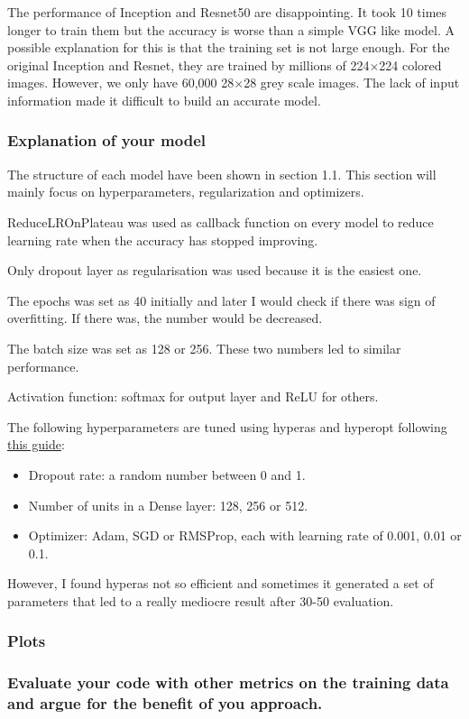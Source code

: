 \documentclass[12pt]{article}
\begin{document}
The performance of Inception and Resnet50 are disappointing. It took 10 times longer to train them but the accuracy is worse than a simple VGG like model. A possible explanation for this is that the training set is not large enough. For the original Inception and Resnet, they are trained by millions of 
224$\times$224 colored images. However, we only have 60,000 28$\times$28 grey scale images. The lack of input information made it difficult to build an accurate model.

\subsubsection{Explanation of your model}

The structure of each model have been shown in section 1.1. This section will mainly focus on hyperparameters, regularization and optimizers.

ReduceLROnPlateau was used as callback function on every model to reduce learning rate when the accuracy has stopped improving.

Only dropout layer as regularisation was used because it is the easiest one.

The epochs was set as 40 initially and later I would check if there was sign of overfitting. If there was, the number would be decreased.

The batch size was set as 128 or 256. These two numbers led to similar performance.

Activation function: softmax for output layer and ReLU for others.

The following hyperparameters are tuned using hyperas and hyperopt following \href{https://towardsdatascience.com/a-guide-to-an-efficient-way-to-build-neural-network-architectures-part-ii-hyper-parameter-42efca01e5d7}{this guide}:
\begin{itemize}
  \item Dropout rate: a random number between 0 and 1.
  \item Number of units in a Dense layer: 128, 256 or 512.
  \item Optimizer: Adam, SGD or RMSProp, each with learning rate of 0.001, 0.01 or 0.1.
\end{itemize}

However, I found hyperas not so efficient and sometimes it generated a set of parameters that led to a really mediocre result after 30-50 evaluation.

\subsubsection{Plots}

\subsubsection{Evaluate your code with other metrics on the training data and argue for the benefit of you approach.}
\end{document}

